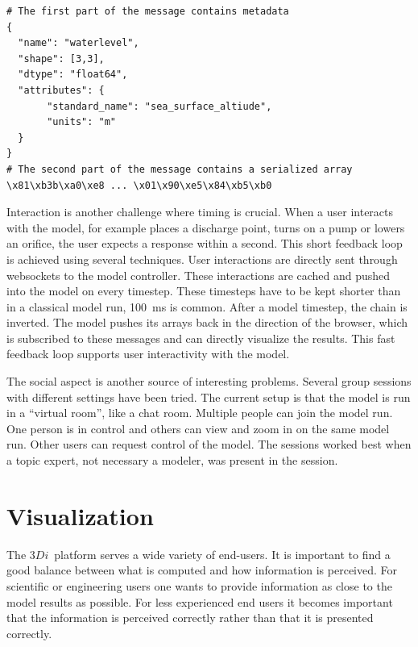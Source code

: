 \documentclass[a4paper]{article}
\DeclareRobustCommand{\threedi}{$3Di$~}
\begin{document}
\begin{lstlisting}[caption=MMI message,label=lst:mmi]
# The first part of the message contains metadata
{
  "name": "waterlevel",
  "shape": [3,3],
  "dtype": "float64",
  "attributes": {
       "standard_name": "sea_surface_altiude",
       "units": "m"
  }
}
# The second part of the message contains a serialized array
\x81\xb3b\xa0\xe8 ... \x01\x90\xe5\x84\xb5\xb0
\end{lstlisting}

Interaction is another challenge where timing is crucial. When a user interacts with the model, for example places a discharge point, turns on a pump or lowers an orifice, the user expects a response within a second. This short feedback loop is achieved using several techniques. User interactions are directly sent through websockets \citep{Hickson2012} to the model controller. These interactions are cached and pushed into the model on every timestep. These timesteps have to be kept shorter than in a classical model run, \SI{100}{\milli\second} is common. After a model timestep, the chain is inverted. The model pushes its arrays back in the direction of the browser, which is subscribed to these messages and can directly visualize the results. This fast feedback loop supports user interactivity with the model.

The social aspect is another source of interesting problems. Several group sessions with different settings have been tried. The current setup is that the model is run in a ``virtual room'', like a chat room. Multiple people can join the model run. One person is in control and others can view and zoom in on the same model run. Other users can request control of the model. The sessions worked best when a topic expert, not necessary a modeler, was present in the session.

\section{Visualization}
The \threedi platform serves a wide variety of end-users. It is important to find a good balance between what is computed and how information is perceived. For scientific or engineering users one wants to provide information as close to the model results as possible. For less experienced end users it becomes important that the information is perceived correctly rather than that it is presented correctly.
\end{document}
